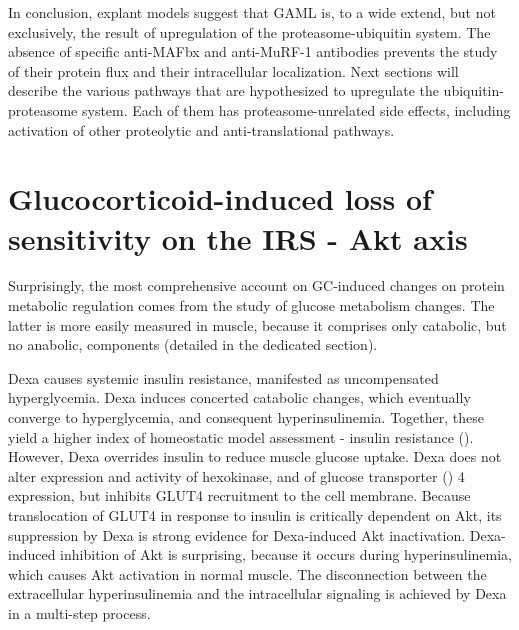 \documentclass[12pt,english]{report}\usepackage[]{graphicx}\usepackage[]{color}
\begin{document}
In conclusion, explant models suggest that GAML is, to a wide extend,
but not exclusively, the result of upregulation of the proteasome-ubiquitin
system. The absence of specific anti-MAFbx and anti-MuRF-1 antibodies
prevents the study of their protein flux and their intracellular localization\citep{bodine2014skeletal}.
Next sections will describe the various pathways that are hypothesized
to upregulate the ubiquitin-proteasome system. Each of them has proteasome-unrelated
side effects, including activation of other proteolytic and anti-translational
pathways.


\section{Glucocorticoid-induced loss of sensitivity on the IRS - Akt axis}

Surprisingly, the most comprehensive account on GC-induced changes
on protein metabolic regulation comes from the study of glucose metabolism
changes. The latter is more easily measured in muscle, because it
comprises only catabolic, but no anabolic, components (detailed in
the dedicated section).

Dexa causes systemic insulin resistance, manifested as uncompensated
hyperglycemia\citep{nicastro2012effectsa}. Dexa induces concerted
catabolic changes, which eventually converge to hyperglycemia, and
consequent hyperinsulinemia. Together, these yield a higher index
of homeostatic model assessment - insulin resistance ()\citep{saad1993modulation}.
However, Dexa overrides insulin to reduce muscle glucose uptake\citep{weinstein1995glucocorticoid-induced,dardevet1998glucocorticoid,dardevet1999glucocorticoid-induced}.
Dexa does not alter expression and activity of hexokinase, and of
glucose transporter () 4
expression\citep{dimitriadis1997effects}, but inhibits GLUT4 recruitment
to the cell membrane\citep{weinstein1995glucocorticoid-induced,dimitriadis1997effects}.
Because translocation of GLUT4 in response to insulin is critically
dependent on Akt\citep{wang1999protein}, its suppression by Dexa
is strong evidence for Dexa-induced Akt inactivation. Dexa-induced
inhibition of Akt is surprising, because it occurs during hyperinsulinemia,
which causes Akt activation in normal muscle. The disconnection between
the extracellular hyperinsulinemia and the intracellular signaling
is achieved by Dexa in a multi-step process.
\end{document}
